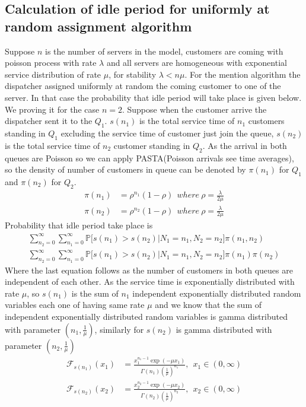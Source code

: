 \documentclass[a4paper,english,12pt]{article}
\begin{document}
\subsection{Calculation of idle period for uniformly at random assignment algorithm}
 Suppose $n$ is the number of servers in the model, customers are coming with poisson process with rate $\lambda$ and all servers are homogeneous with exponential service distribution of rate $\mu$, for stability $\lambda < n\mu$. For the mention algorithm the dispatcher assigned uniformly at random the coming customer to one of the server. In that case the probability that idle period will take place is given below. We proving it for the case $n=2$. Suppose when the customer arrive the dispatcher sent it to the $Q_1$. $s(n_1)$ is the total service time of $n_1$ customers standing in $Q_1$ excluding the service time of customer just join the queue, $s(n_2)$ is the total service time of $n_2$ customer standing in $Q_2$. As the arrival in both queues are Poisson so we can apply PASTA(Poisson arrivals see time averages), so the density of number of customers in queue can be denoted by $\pi(n_1)$ for $Q_1$ and $\pi(n_2)$ for $Q_2$.
 \begin{align*} 
 \pi(n_1) &= \rho ^{n_1}(1 - \rho) \ \ where\ \rho = \frac{\lambda}{2 \mu}\\
 \pi(n_2) &= \rho ^{n_2}(1 - \rho) \ \ where\ \rho = \frac{\lambda}{2 \mu}
 \end{align*}
 Probability that idle period take place is
 \begin{align}
 \sum_{n_2=0}^{\infty}\sum_{n_1=0}^{\infty} \mathbb{P}\bigg[s(n_1) > s(n_2) | N_1 =n_1, N_2 =n_2\bigg] \pi(n_1,n_2)\\
 \sum_{n_2=0}^{\infty}\sum_{n_1=0}^{\infty} \mathbb{P}\bigg[s(n_1) > s(n_2) | N_1 =n_1, N_2 =n_2\bigg] \pi(n_1)\pi(n_2)
 \end{align}
Where the last equation follows as the number of customers in both queues are independent of each other. As the service time is exponentially distributed with rate $\mu$, so $s(n_1)$ is the sum of $n_1$ independent exponentially distributed random variables each one of having same rate $\mu$ and we know that the sum of independent exponentially distributed random variables is gamma distributed with parameter $(n_1, \frac{1}{\mu})$, similarly for $s(n_2)$ is gamma distributed with parameter $(n_2,\frac{1}{\mu})$
\begin{align*}
\mathcal{F}_{s(n_1)}(x_1) &= \frac{x_1^{n_1 - 1} \exp(- \mu x_1)}{\Gamma(n_1)(\frac{1}{\mu})^{n_1}}, \ \ x_1 \in (0, \infty)\\
\mathcal{F}_{s(n_2)}(x_2) &= \frac{x_2^{n_2 - 1} \exp(- \mu x_2)}{\Gamma(n_2)(\frac{1}{\mu})^{n_2}}, \ \ x_2 \in (0, \infty)
\end{align*}
\end{document}
